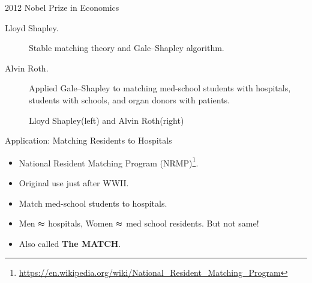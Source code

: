 \documentclass{beamer}
\begin{document}
\begin{frame}{2012 Nobel Prize in Economics}
	\begin{description}
		\item [Lloyd Shapley.] Stable matching theory and Gale–Shapley algorithm.
	\end{description}
	\begin{figure}
	\end{figure} 
	\begin{description}
		\item [Alvin Roth.] Applied Gale–Shapley to matching med-school students with
		hospitals, students with schools, and organ donors with patients.
	\end{description}
	\begin{figure}
		\caption{Lloyd Shapley(left) and Alvin Roth(right)}
	\end{figure} 
\end{frame}
	
\begin{frame}{Application: Matching Residents to Hospitals}
	\begin{itemize}
		\item National Resident Matching Program (NRMP)\footnote{\url{https://en.wikipedia.org/wiki/National_Resident_Matching_Program}}.
		\item Original use just after WWII.
		\item Match med-school students to hospitals.
		\item Men $\thickapprox$ hospitals, Women $\thickapprox$ med school residents. But not same!
		\item Also called \textbf{The MATCH}.
	\end{itemize}
\end{frame}
\end{document}
